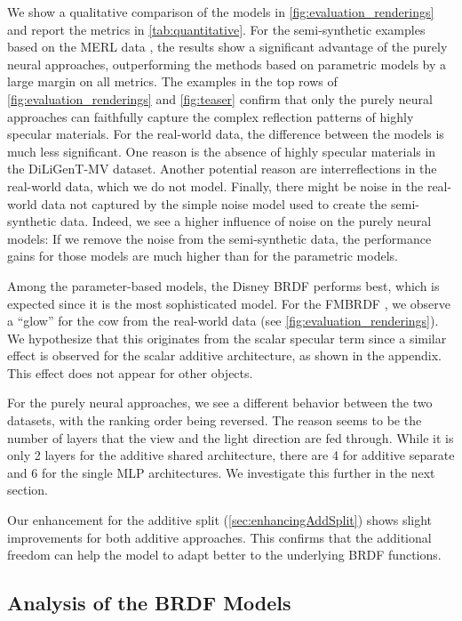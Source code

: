 We show a qualitative comparison of the models in \cref{fig:evaluation_renderings} and report the metrics in \cref{tab:quantitative}.
For the semi-synthetic examples based on the MERL data \cite{matusik2003MERL}, the results show a significant advantage of the purely neural approaches, outperforming the methods based on parametric models by a large margin on all metrics. The examples in the top rows of \cref{fig:evaluation_renderings} and \cref{fig:teaser} confirm that only the purely neural approaches can faithfully capture the complex reflection patterns of highly specular materials. For the real-world data, the difference between the models is much less significant. One reason is the absence of highly specular materials in the DiLiGenT-MV dataset. Another potential reason are interreflections in the real-world data, which we do not model. Finally, there might be noise in the real-world data not captured by the simple noise model used to create the semi-synthetic data. Indeed, we see a higher influence of noise on the purely neural models: If we remove the noise from the semi-synthetic data, the performance gains for those models are much higher than for the parametric models.

Among the parameter-based models, the Disney BRDF \cite{burley2012physically} performs best, which is expected since it is the most sophisticated model. For the FMBRDF \cite{ichikawa2023fresnel}, we observe a ``glow'' for the cow from the real-world data (see \cref{fig:evaluation_renderings}). We hypothesize that this originates from the scalar specular term since a similar effect is observed for the scalar additive architecture, as shown in the appendix. This effect does not appear for other objects.

For the purely neural approaches, we see a different behavior between the 
two datasets, 
with the ranking order being reversed. The reason seems to be the number of layers that the view and the light direction are fed through. While it is only 2 layers for the additive shared architecture, there are 4 for additive separate and 6 for the single MLP architectures. We investigate this further in the next section.

Our enhancement for the additive split (\cf \cref{sec:enhancingAddSplit}) shows slight improvements for both additive approaches. This confirms that the additional freedom can help the model to adapt better to the underlying BRDF functions.

\subsection{Analysis of the BRDF Models}
\label{sec:analysis_brdf_models}

